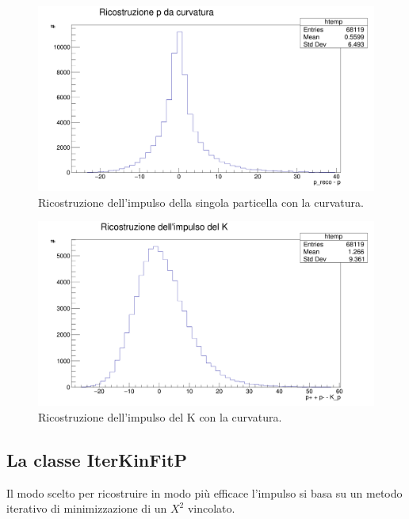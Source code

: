 \documentclass[8pt]{extarticle}
\begin{document}
\begin{figure}
	\begin{center}
		\includegraphics[scale=0.25]{reco_p_curvatura} 
		\caption{Ricostruzione dell'impulso della singola particella con la curvatura.}
		\label{fig:reco_p_curvatura}
	\end{center}
\end{figure}

\begin{figure}
	\begin{center}
		\includegraphics[scale=0.25]{reco_pk_curvatura} 
		\caption{Ricostruzione dell'impulso del K con la curvatura.}
		\label{fig:reco_pk_curvatura}
	\end{center}
\end{figure}

\subsection{La classe IterKinFitP}
Il modo scelto per ricostruire in modo più efficace l'impulso si basa su un metodo iterativo di minimizzazione di un $X^2$ vincolato.  
\end{document}
